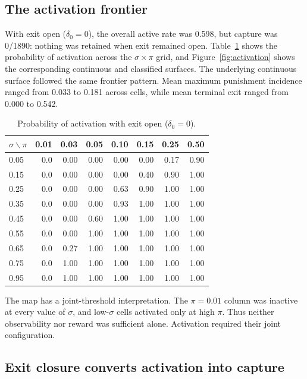 \documentclass[12pt]{article}
\begin{document}
\subsection{The activation frontier}

With exit open ($\delta_0=0$), the overall active rate was 0.598, but capture was 0/1890: nothing was retained when exit remained open. Table~\ref{tab:activation-frontier} shows the probability of activation across the $\sigma\times\pi$ grid, and Figure~\ref{fig:activation} shows the corresponding continuous and classified surfaces. The underlying continuous surface followed the same frontier pattern. Mean maximum punishment incidence ranged from 0.033 to 0.181 across cells, while mean terminal exit ranged from 0.000 to 0.542.

\begin{table}[htbp]
\centering
\caption{Probability of activation with exit open ($\delta_0=0$).}
\label{tab:activation-frontier}
\begin{tabular}{lrrrrrrr}
\hline
$\sigma\backslash\pi$ & 0.01 & 0.03 & 0.05 & 0.10 & 0.15 & 0.25 & 0.50 \\
\hline
0.05 & 0.0 & 0.00 & 0.00 & 0.00 & 0.00 & 0.17 & 0.90 \\
0.15 & 0.0 & 0.00 & 0.00 & 0.00 & 0.40 & 0.90 & 1.00 \\
0.25 & 0.0 & 0.00 & 0.00 & 0.63 & 0.90 & 1.00 & 1.00 \\
0.35 & 0.0 & 0.00 & 0.00 & 0.93 & 1.00 & 1.00 & 1.00 \\
0.45 & 0.0 & 0.00 & 0.60 & 1.00 & 1.00 & 1.00 & 1.00 \\
0.55 & 0.0 & 0.00 & 1.00 & 1.00 & 1.00 & 1.00 & 1.00 \\
0.65 & 0.0 & 0.27 & 1.00 & 1.00 & 1.00 & 1.00 & 1.00 \\
0.75 & 0.0 & 1.00 & 1.00 & 1.00 & 1.00 & 1.00 & 1.00 \\
0.95 & 0.0 & 1.00 & 1.00 & 1.00 & 1.00 & 1.00 & 1.00 \\
\hline
\end{tabular}
\end{table}

The map has a joint-threshold interpretation. The $\pi=0.01$ column was inactive at every value of $\sigma$, and low-$\sigma$ cells activated only at high $\pi$. Thus neither observability nor reward was sufficient alone. Activation required their joint configuration.

\subsection{Exit closure converts activation into capture}
\end{document}
